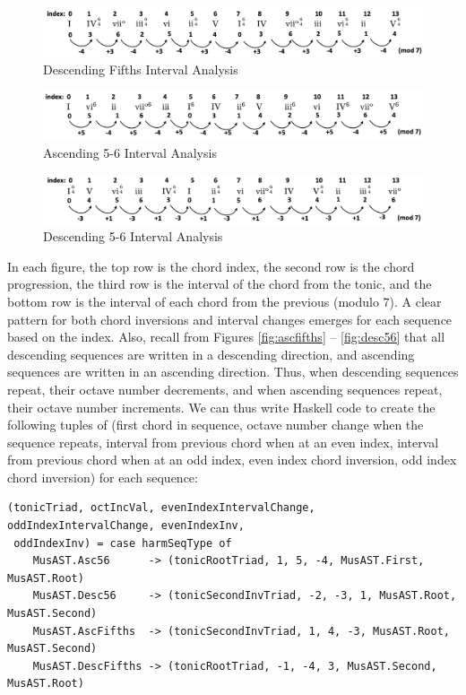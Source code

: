 \documentclass{report}
\begin{document}
\begin{figure}[h!]
\centering
\includegraphics[width=\textwidth]{images/desc_fifths_intervals}
  \caption{Descending Fifths Interval Analysis}
\end{figure}

\begin{figure}[h!]
\centering
\includegraphics[width=\textwidth]{images/asc_56_intervals}
  \caption{Ascending 5-6 Interval Analysis}
\end{figure}

\begin{figure}[h!]
\centering
\includegraphics[width=\textwidth]{images/desc_56_intervals}
  \caption{Descending 5-6 Interval Analysis}
\end{figure}

In each figure, the top row is the chord index, the second row is the chord progression, the third row is the interval of the chord from the tonic, and the bottom row is the interval of each chord from the previous (modulo 7). A clear pattern for both chord inversions and interval changes emerges for each sequence based on the index. Also, recall from Figures \ref{fig:ascfifths} -- \ref{fig:desc56} that all descending sequences are written in a descending direction, and ascending sequences are written in an ascending direction. Thus, when descending sequences repeat, their octave number decrements, and when ascending sequences repeat, their octave number increments. We can thus write Haskell code to create the following tuples of (first chord in sequence, octave number change when the sequence repeats, interval from previous chord when at an even index, interval from previous chord when at an odd index, even index chord inversion, odd index chord inversion) for each sequence:

\begin{verbatim}
(tonicTriad, octIncVal, evenIndexIntervalChange, oddIndexIntervalChange, evenIndexInv, 
 oddIndexInv) = case harmSeqType of 
    MusAST.Asc56      -> (tonicRootTriad, 1, 5, -4, MusAST.First, MusAST.Root)
    MusAST.Desc56     -> (tonicSecondInvTriad, -2, -3, 1, MusAST.Root, MusAST.Second)
    MusAST.AscFifths  -> (tonicSecondInvTriad, 1, 4, -3, MusAST.Root, MusAST.Second)
    MusAST.DescFifths -> (tonicRootTriad, -1, -4, 3, MusAST.Second, MusAST.Root)
\end{verbatim}
\end{document}
